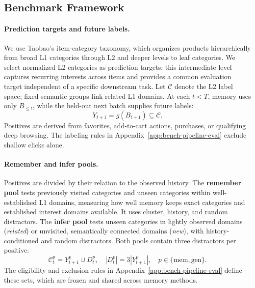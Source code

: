 \documentclass[sigconf,nonacm,balance=false]{acmart}
\begin{document}
\subsection{Benchmark Framework}
\label{sec:benchmark-framework}

\paragraph{\textbf{Prediction targets and future labels.}}
We use Taobao's item-category taxonomy, which organizes products hierarchically from broad L1 categories through L2 and deeper levels to leaf categories. We select normalized L2 categories as prediction targets: this intermediate level captures recurring interests across items and provides a common evaluation target independent of a specific downstream task. Let $\mathcal{C}$ denote the L2 label space; fixed semantic groups link related L1 domains. At each $t<T$, memory uses only $B_{\leq t}$, while the held-out next batch supplies future labels:
\begin{equation}
    Y_{t+1}=g(B_{t+1})\subseteq\mathcal{C}.
\end{equation}
Positives are derived from favorites, add-to-cart actions, purchases, or qualifying deep browsing. The labeling rules in Appendix~\ref{app:bench-pipeline-eval} exclude shallow clicks alone.






\paragraph{\textbf{Remember and infer pools.}}
Positives are divided by their relation to the observed history. The \textbf{remember pool} tests previously visited categories and unseen categories within well-established L1 domains, measuring how well memory keeps exact categories and established interest domains available. It uses cluster, history, and random distractors. The \textbf{infer pool} tests unseen categories in lightly observed domains (\emph{related}) or unvisited, semantically connected domains (\emph{new}), with history-conditioned and random distractors. Both pools contain three distractors per positive:
\begin{equation}
    \mathcal{C}_t^p=Y_{t+1}^p\cup D_t^p,\quad |D_t^p|=3|Y_{t+1}^p|,\quad p\in\{\mathrm{mem},\mathrm{gen}\}.
\end{equation}
The eligibility and exclusion rules in Appendix~\ref{app:bench-pipeline-eval} define these sets, which are frozen and shared across memory methods.
\end{document}
